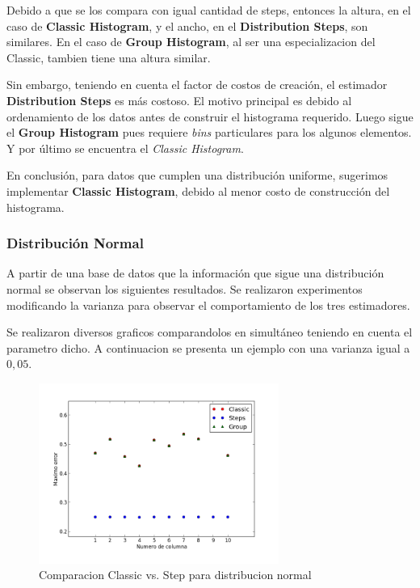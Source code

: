 \documentclass[10pt, a4paper,english,spanish,hidelinks]{article}
\begin{document}
Debido a que se los compara con igual cantidad de steps, entonces la altura, en el caso de
\textbf{Classic Histogram}, y el ancho, en el \textbf{Distribution Steps}, son similares.
En el caso de \textbf{Group Histogram}, al ser una especializacion del Classic, tambien tiene
una altura similar.

Sin embargo, teniendo en cuenta el factor de costos de creación, el estimador
\textbf{Distribution Steps} es más costoso. El motivo principal es debido al ordenamiento
de los datos antes de construir el histograma requerido. Luego sigue el \textbf{Group Histogram}
pues requiere \textit{bins} particulares para los algunos elementos. Y por último se encuentra el \textit{Classic Histogram}.

En conclusión, para datos que cumplen una distribución uniforme, sugerimos implementar
\textbf{Classic Histogram}, debido al menor costo de construcción del histograma.


\subsubsection{Distribución Normal}

A partir de una base de datos que la información que sigue una distribución normal se observan los siguientes resultados. Se realizaron experimentos modificando la varianza para observar el comportamiento de los tres estimadores.

Se realizaron diversos graficos comparandolos en simultáneo teniendo en cuenta el parametro dicho. 
A continuacion se presenta un ejemplo con una varianza igual a $0,05$. 

\begin{figure}[h!]
  \centering
  \includegraphics[width=0.7\textwidth]{./imagenes/ejb2_normal_t_005.png}
  \caption{Comparacion Classic vs. Step para distribucion normal}
\end{figure}
\end{document}
